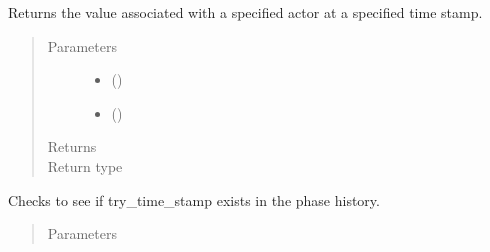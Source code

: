 \documentclass[letterpaper,10pt,openany,oneside,english]{sphinxmanual}
\begin{document}
\begin{fulllineitems}

\begin{fulllineitems}
\label{\detokenize{support_rst/phase:phase.Phase.get_value}}
Returns the value associated with a specified actor at a specified
time stamp.
\begin{quote}\begin{description}
\item[{Parameters}] \leavevmode\begin{itemize}
\item {} 
 () \textendash{} 

\item {} 
 () \textendash{} 

\end{itemize}

\item[{Returns}] \leavevmode
{}

\item[{Return type}] \leavevmode
{}

\end{description}\end{quote}

\end{fulllineitems}


\begin{fulllineitems}
\label{\detokenize{support_rst/phase:phase.Phase.has_time_stamp}}
Checks to see if try\_time\_stamp exists in the phase history.
\begin{quote}\begin{description}
\item[{Parameters}] \leavevmode
{} \textendash{} 


\end{description}
\end{quote}
\end{fulllineitems}
\end{fulllineitems}
\end{document}

